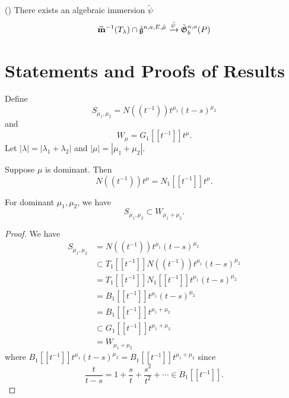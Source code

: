 \documentclass{article}
\begin{document}

\begin{theorem}(\cite[Theorem 1.2 and 5.3]{mirkovic2007quiver})
    There exists an algebraic immersion $\tilde\psi$ 
    $$\widetilde{\bf m}^{-1}(T_\lambda)\cap\tilde{\mathfrak g}^{n,a,E,\tilde\mu}\xrightarrow{\tilde\psi}\tilde{\mathfrak G}^{n,a}_{b}(P)$$
\end{theorem}



\section{Statements and Proofs of Results}

Define
\[
S_{\mu_1, \mu_2} = N((t^{-1}))t^{\mu_1}(t-s)^{\mu_2}
\]
and
\[
W_\mu = G_1 [[t^{-1}]]t^\mu.
\]
Let $|\lambda| = |\lambda_1 + \lambda_2|$ and $|\mu| = |\mu_1 + \mu_2|$.


\begin{lemma}
Suppose $\mu$ is dominant. Then 
\[
N((t^{-1})) t^\mu = N_1[[t^{-1}]] t^\mu.
\]
\end{lemma}

\begin{lemma}
For dominant $\mu_1,\mu_2$, we have
\[
S_{\mu_1, \mu_2} \subset W_{\mu_1 + \mu_2}.
\]
\end{lemma}

\begin{proof}
We have
\[
\begin{split}
    S_{\mu_1, \mu_2} & = N((t^{-1}))t^{\mu_1}(t-s)^{\mu_2} \\
     & \subset T_1[[t^{-1}]] N((t^{-1})) t^{\mu_1} (t-s)^{\mu_2} \\
     & = T_1[[t^{-1}]] N_1[[t^{-1}]] t^{\mu_1} (t-s)^{\mu_2} \\
     & = B_1[[t^{-1}]] t^{\mu_1} (t-s)^{\mu_2} \\
     & = B_1[[t^{-1}]] t^{\mu_1 + \mu_2} \\
     & \subset G_1[[t^{-1}]] t^{\mu_1 + \mu_2} \\
     & = W_{\mu_1 + \mu_2}
\end{split}
\]
where $B_1[[t^{-1}]] t^{\mu_1} (t-s)^{\mu_2} = B_1[[t^{-1}]] t^{\mu_1 + \mu_2}$ since 
\[
\frac{t}{t-s} = 
1 + \frac{s}{t} + \frac{s^2}{t^2} + \cdots 
\in B_1[[t^{-1}]].
\]
\end{proof}
\end{document}

